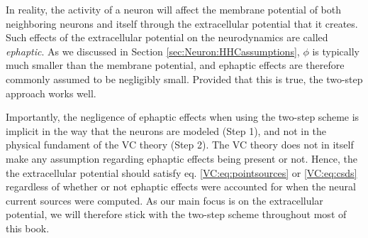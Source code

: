In reality, the activity of a neuron will affect the membrane potential of both neighboring neurons and itself through the extracellular potential that it creates. Such effects of the extracellular potential on the neurodynamics are called \textit{ephaptic}. As we discussed in Section \ref{sec:Neuron:HHCassumptions}, $\phi$ is typically much smaller than the membrane potential, and ephaptic effects are therefore commonly assumed to be negligibly small. Provided that this is true, the two-step approach works well. 

Importantly, the negligence of ephaptic effects when using the two-step scheme is implicit in the way that the neurons are modeled (Step 1), and not in the physical fundament of the VC theory (Step 2). The VC theory does not in itself make any assumption regarding ephaptic effects being present or not. Hence, the the extracellular potential should satisfy eq. \ref{VC:eq:pointsources} or \ref{VC:eq:csds} regardless of whether or not ephaptic effects were accounted for when the neural current sources were computed. As our main focus is on the extracellular potential, we will therefore stick with the two-step scheme throughout most of this book.